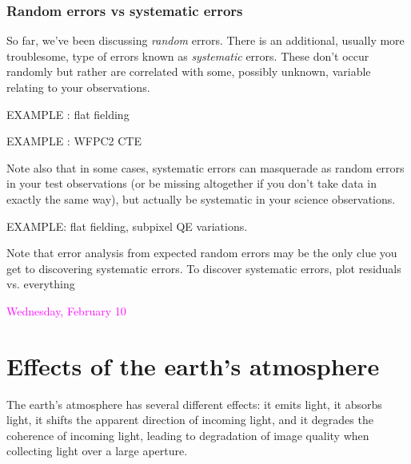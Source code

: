 \documentclass[12pt]{article}
\begin{document}
\subsubsection*{Random errors vs systematic errors}
So far, we've been discussing \emph{random} errors.
There is an additional,
usually more troublesome, type of errors known as \emph{systematic} errors.
These don't occur randomly but rather are correlated with some,
possibly unknown, variable relating to your observations.

EXAMPLE : flat fielding

EXAMPLE : WFPC2 CTE

Note also that in some cases, systematic errors can masquerade as
random errors in your test observations (or be missing altogether if
you don't take data in exactly the same way), but actually be
systematic in your science observations.

EXAMPLE: flat fielding, subpixel QE variations.

Note that error analysis from expected random errors may be the only
clue you get to discovering systematic errors. To discover systematic
errors, plot residuals vs. everything

\textcolor{magenta}{Wednesday, February 10}
\section*{Effects of the earth's atmosphere}
The earth's atmosphere has several different effects: it emits light,
it absorbs light, it shifts the apparent direction of incoming light,
and it degrades the coherence of incoming light, leading to
degradation of image quality when collecting light over a large
aperture.
\end{document}
